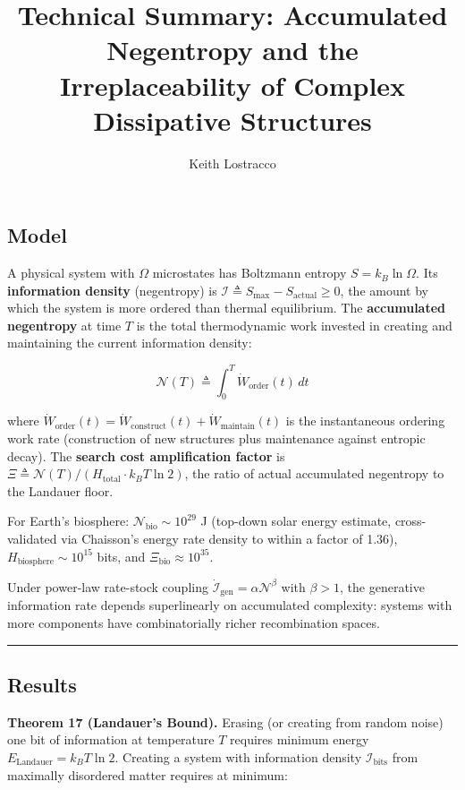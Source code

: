 \documentclass[11pt]{article}
\title{Technical Summary: Accumulated Negentropy and the
Irreplaceability of Complex Dissipative Structures}
\author{Keith Lostracco}
\date{}
\begin{document}
\maketitle

\subsection{Model}\label{model}

A physical system with \(\Omega\) microstates has Boltzmann entropy
\(S = k_B \ln \Omega\). Its \textbf{information density} (negentropy) is
\(\mathcal{I} \triangleq S_{\max} - S_{\text{actual}} \geq 0\), the
amount by which the system is more ordered than thermal equilibrium. The
\textbf{accumulated negentropy} at time \(T\) is the total thermodynamic
work invested in creating and maintaining the current information
density:

\[\mathcal{N}(T) \triangleq \int_0^T \dot{W}_{\text{order}}(t) \, dt\]

where
\(\dot{W}_{\text{order}}(t) = \dot{W}_{\text{construct}}(t) + \dot{W}_{\text{maintain}}(t)\)
is the instantaneous ordering work rate (construction of new structures
plus maintenance against entropic decay). The \textbf{search cost
amplification factor} is
\(\Xi \triangleq \mathcal{N}(T) / (H_{\text{total}} \cdot k_B T \ln 2)\),
the ratio of actual accumulated negentropy to the Landauer floor.

For Earth's biosphere: \(\mathcal{N}_{\text{bio}} \sim 10^{29}\) J
(top-down solar energy estimate, cross-validated via Chaisson's energy
rate density to within a factor of 1.36),
\(H_{\text{biosphere}} \sim 10^{15}\) bits, and
\(\Xi_{\text{bio}} \approx 10^{35}\).

Under power-law rate-stock coupling
\(\dot{\mathcal{I}}_{\text{gen}} = \alpha \mathcal{N}^\beta\) with
\(\beta > 1\), the generative information rate depends superlinearly on
accumulated complexity: systems with more components have
combinatorially richer recombination spaces.

\begin{center}\rule{0.5\linewidth}{0.5pt}\end{center}

\subsection{Results}\label{results}

\textbf{Theorem 17 (Landauer's Bound).} Erasing (or creating from random
noise) one bit of information at temperature \(T\) requires minimum
energy \(E_{\text{Landauer}} = k_B T \ln 2\). Creating a system with
information density \(\mathcal{I}_{\text{bits}}\) from maximally
disordered matter requires at minimum:
\end{document}
